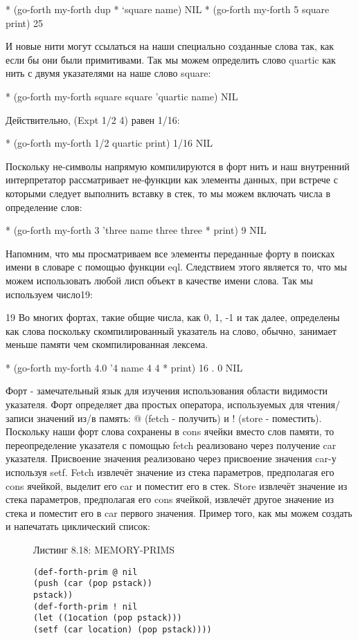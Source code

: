 {{{* (go-forth my-forth
{ dup * } ‘square name)
NIL
* (go-forth my-forth
5 square print)
25

И новые нити могут ссылаться на наши специально созданные слова так, как если бы они были примитивами. Так мы можем определить слово quartic как нить с двумя указателями на наше слово square:

* (go-forth my-forth
{ square square } ’quartic name)
NIL

Действительно, (Expt 1/2 4) равен 1/16:

* (go-forth my-forth
1/2 quartic print)
1/16
NIL

Поскольку не-символы напрямую компилируются в форт нить и наш внутренний интерпретатор рассматривает  не-функции как элементы данных, при встрече с которыми следует выполнить вставку в стек, то мы можем включать числа в определение слов:

* (go-forth my-forth
{ 3 } ’three name
three three * print)
9
NIL

Напомним, что мы просматриваем все элементы переданные форту в поисках имени в словаре с помощью функции eql. Следствием этого является то, что мы можем использовать любой лисп объект в качестве имени слова. Так мы используем число19:

19 Во многих фортах, такие общие числа, как 0, 1, -1 и так далее, определены как слова поскольку скомпилированный указатель на слово, обычно, занимает меньше памяти чем скомпилированная лексема.

* (go-forth my-forth
{ 4.0 } ’4 name
4 4 * print)
16 . 0
NIL

Форт - замечательный язык для изучения использования области видимости указателя. Форт определяет два простых оператора, используемых для чтения/записи значений из/в память: @ (fetch - получить) и ! (store - поместить). Поскольку наши форт слова сохранены в cons ячейки вместо слов памяти, то переопределение указателя с помощью fetch реализовано через получение car указателя. Присвоение значения реализовано через присвоение значения car-у используя setf. Fetch извлечёт значение из стека параметров, предполагая его cons ячейкой, выделит его car и поместит его в стек. Store извлечёт значение из стека параметров, предполагая его cons ячейкой, извлечёт другое значение из стека и поместит его в car первого значения. Пример того, как мы можем создать и напечатать циклический список:

\begin{figure}Листинг 8.18: MEMORY-PRIMS\label{listing_8.18}
\listbegin
\begin{verbatim}
(def-forth-prim @ nil
(push (car (pop pstack))
pstack))
(def-forth-prim ! nil
(let ((1ocation (pop pstack)))
(setf (car location) (pop pstack))))
\end{verbatim}
\listend
\end{figure}

}}}
